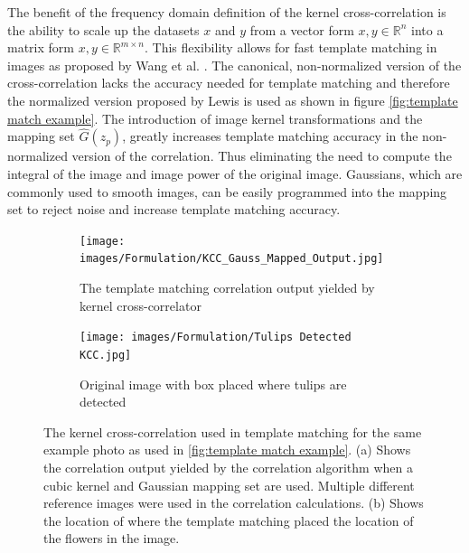     The benefit of the frequency domain definition of the kernel cross-correlation is the ability to scale up the datasets $x$ and $y$ from a vector form $x,y \in \mathbb{R}^n$ into a matrix form $x,y \in \mathbb{R}^{m \times n}$. This flexibility allows for fast template matching in images as proposed by Wang et al. \cite{wang_kernel_2018}. The canonical, non-normalized version of the cross-correlation lacks the accuracy needed for template matching and therefore the normalized version proposed by Lewis \cite{lewis_fast_1995} is used as shown in figure \ref{fig:template match example}. The introduction of image kernel transformations and the mapping set $\hat{G}(z_p)$, greatly increases template matching accuracy in the non-normalized version of the correlation. Thus eliminating the need to compute the integral of the image and image power of the original image. Gaussians, which are commonly used to smooth images, can be easily programmed into the mapping set to reject noise and increase template matching accuracy. 

    \begin{figure} [h]
        \centering
        \begin{subfigure}[c]{0.49\textwidth}
            \centering
            \captionsetup{width=0.75\textwidth}
            \texttt{[image: images/Formulation/KCC\_Gauss\_Mapped\_Output.jpg]}
            \caption{The template matching correlation output yielded by kernel cross-correlator}
            \label{fig:KCC Template Output}
        \end{subfigure}
            \begin{subfigure}[c]{0.49\textwidth}
            \centering
            \captionsetup{width=0.75\textwidth}
            \texttt{[image: images/Formulation/Tulips Detected KCC.jpg]}
            \caption{Original image with box placed where tulips are detected}
            \label{fig:KCC Template Matched}
        \end{subfigure}
        \hfill
        \caption{The kernel cross-correlation used in template matching for the same example photo as used in \ref{fig:template match example}. (a) Shows the correlation output yielded by the correlation algorithm when a cubic kernel and Gaussian mapping set are used. Multiple different reference images were used in the correlation calculations. (b) Shows the location of where the template matching placed the location of the flowers in the image.}
        \label{fig:KCC Used in Template Matching}
        \hfill
    \end{figure}

